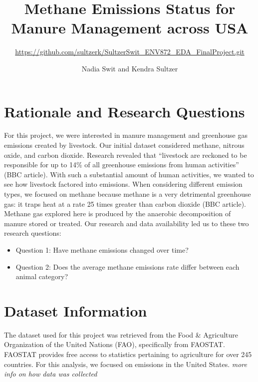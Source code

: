 \documentclass[
  12pt,
]{article}
\title{Methane Emissions Status for Manure Management across USA}
\subtitle{\url{https://github.com/sultzerk/SultzerSwit_ENV872_EDA_FinalProject.git}}
\author{Nadia Swit and Kendra Sultzer}
\date{}
\begin{document}
\maketitle

\newpage
\tableofcontents 
\newpage
\listoftables 
\newpage
\listoffigures 
\newpage

\hypertarget{rationale-and-research-questions}{%
\section{Rationale and Research
Questions}\label{rationale-and-research-questions}}

For this project, we were interested in manure management and greenhouse
gas emissions created by livestock. Our initial dataset considered
methane, nitrous oxide, and carbon dioxide. Research revealed that
``livestock are reckoned to be responsible for up to 14\% of all
greenhouse emissions from human activities'' (BBC article). With such a
substantial amount of human activities, we wanted to see how livestock
factored into emissions. When considering different emission types, we
focused on methane because methane is a very detrimental greenhouse gas:
it traps heat at a rate 25 times greater than carbon dioxide (BBC
article). Methane gas explored here is produced by the anaerobic
decomposition of manure stored or treated. Our research and data
availability led us to these two research questions:

\begin{itemize}
\item
  Question 1: Have methane emissions changed over time?
\item
  Question 2: Does the average methane emissions rate differ between
  each animal category?
\end{itemize}

\newpage

\hypertarget{dataset-information}{%
\section{Dataset Information}\label{dataset-information}}

The dataset used for this project was retrieved from the Food \&
Agriculture Organization of the United Nations (FAO), specifically from
FAOSTAT. FAOSTAT provides free access to statistics pertaining to
agriculture for over 245 countries. For this analysis, we focused on
emissions in the United States. \emph{more info on how data was
collected}
\end{document}
